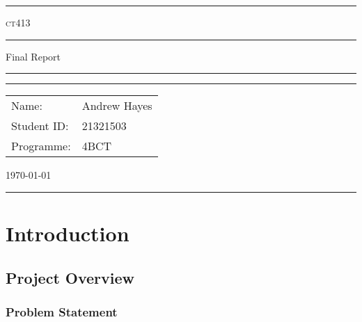 \documentclass[a4paper,11pt]{report}
\author{Andrew Hayes}
\begin{document}
\begin{titlepage}
    \begin{center}
        \hrule
        \vspace*{0.6cm}
        \Huge \textsc{ct413}
        \vspace*{0.6cm}
        \hrule
        \LARGE
       \vspace{0.5cm}
       Final Report
       \vspace{0.5cm}
       \hrule
       \vfill
       \hrule
        \begin{minipage}{0.495\textwidth} 
            \vspace{0.4em}
            \raggedright
            \normalsize 
            \begin{tabular}{@{}l l}
                Name: & Andrew Hayes \\
                Student ID: & 21321503 \\
                Programme: & 4BCT
            \end{tabular}
        \end{minipage}
        \begin{minipage}{0.495\textwidth} 
            \raggedleft
            \vspace*{0.8cm}
            \Large
            \today
            \vspace*{0.6cm}
        \end{minipage}
        \medskip\hrule 
    \end{center}
\end{titlepage}

\newpage
\tableofcontents
\newpage
\setcounter{page}{1}


\chapter{Introduction}
\section{Project Overview}
\subsection{Problem Statement}
\end{document}
